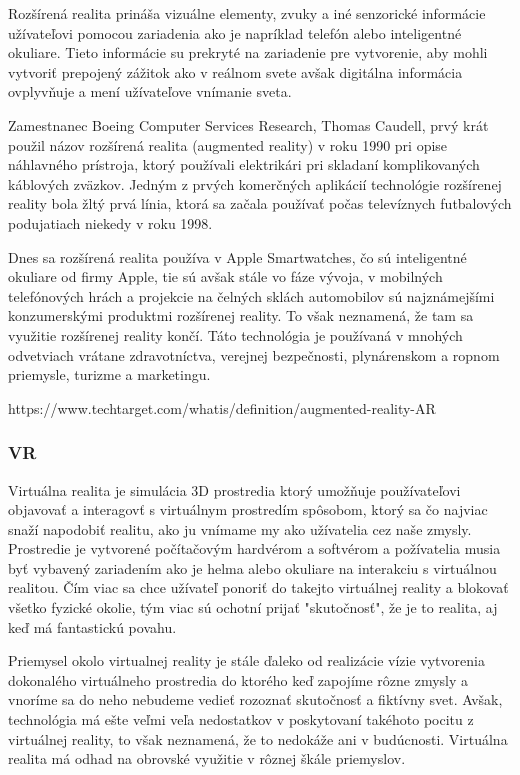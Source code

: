 Rozšírená realita prináša vizuálne elementy, zvuky a iné senzorické informácie užívateľovi pomocou zariadenia ako je napríklad telefón alebo inteligentné okuliare. Tieto informácie su prekryté na zariadenie pre vytvorenie, aby mohli vytvoriť prepojený zážitok ako v reálnom svete avšak digitálna informácia ovplyvňuje a mení užívateľove vnímanie sveta. 

Zamestnanec Boeing Computer Services Research, Thomas Caudell, prvý krát použil názov rozšírená realita (augmented reality) v roku 1990 pri opise náhlavného prístroja, ktorý používali elektrikári pri skladaní komplikovaných káblových zväzkov. Jedným z prvých komerčných aplikácií technológie rozšírenej reality bola žltý prvá línia, ktorá sa začala používať počas televíznych futbalových podujatiach niekedy v roku 1998. 

Dnes sa rozšírená realita používa v Apple Smartwatches, čo sú inteligentné okuliare od firmy Apple, tie sú avšak stále vo fáze vývoja, v mobilných telefónových hrách a projekcie na čelných sklách automobilov sú najznámejšími konzumerskými produktmi rozšírenej reality. To však neznamená, že tam sa využitie rozšírenej reality končí. Táto technológia je používaná v mnohých odvetviach vrátane zdravotníctva, verejnej bezpečnosti, plynárenskom a ropnom priemysle, turizme a marketingu.

https://www.techtarget.com/whatis/definition/augmented-reality-AR

\subsubsection{VR}

Virtuálna realita je simulácia 3D prostredia ktorý umožňuje používateľovi objavovať a interagovť s virtuálnym prostredím spôsobom, ktorý sa čo najviac snaží napodobiť realitu, ako ju vnímame my ako užívatelia cez naše zmysly. Prostredie je vytvorené počítačovým hardvérom a softvérom a požívatelia musia byť vybavený zariadením ako je helma alebo okuliare na interakciu s virtuálnou realitou. Čím viac sa chce užívateľ ponoriť do takejto virtuálnej reality a blokovať všetko fyzické okolie, tým viac sú ochotní prijať "skutočnosť", že je to realita, aj keď má fantastickú povahu.

Priemysel okolo virtualnej reality je stále ďaleko od realizácie vízie vytvorenia dokonalého virtuálneho prostredia do ktorého keď zapojíme rôzne zmysly a  vnoríme sa do neho nebudeme vedieť rozoznať skutočnosť a fiktívny svet. Avšak, technológia má ešte veľmi veľa nedostatkov v poskytovaní takéhoto pocitu z virtuálnej reality, to však neznamená, že to nedokáže ani v budúcnosti. Virtuálna realita má odhad na obrovské využitie v rôznej škále priemyslov. 

